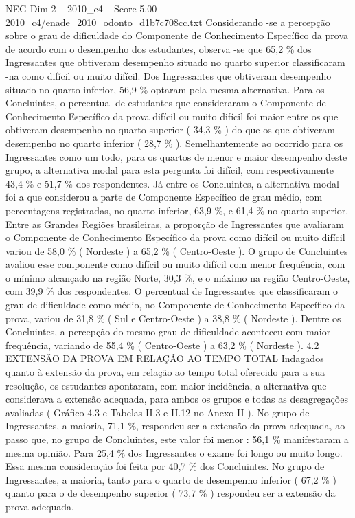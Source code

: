 \begin{textsample}{NEG Dim 2 – 2010\_c4 – Score 5.00 – 2010\_c4/enade\_2010\_odonto\_d1b7c708cc.txt}
Considerando -se a percepção sobre o grau de dificuldade do Componente de Conhecimento Específico da prova de acordo com o desempenho dos estudantes, observa -se que 65,2 \% dos Ingressantes que obtiveram desempenho situado no quarto superior classificaram -na como difícil ou muito difícil.
Dos Ingressantes que obtiveram desempenho situado no quarto inferior, 56,9 \% optaram pela mesma alternativa.
Para os Concluintes, o percentual de estudantes que consideraram o Componente de Conhecimento Específico da prova difícil ou muito difícil foi maior entre os que obtiveram desempenho no quarto superior ( 34,3 \% ) do que os que obtiveram desempenho no quarto inferior ( 28,7 \% ).
Semelhantemente ao ocorrido para os Ingressantes como um todo, para os quartos de menor e maior desempenho deste grupo, a alternativa modal para esta pergunta foi difícil, com respectivamente 43,4 \% e 51,7 \% dos respondentes.
Já entre os Concluintes, a alternativa modal foi a que considerou a parte de Componente Específico de grau médio, com percentagens registradas, no quarto inferior, 63,9 \%, e 61,4 \% no quarto superior.
Entre as Grandes Regiões brasileiras, a proporção de Ingressantes que avaliaram o Componente de Conhecimento Específico da prova como difícil ou muito difícil variou de 58,0 \% ( Nordeste ) a 65,2 \% ( Centro-Oeste ).
O grupo de Concluintes avaliou esse componente como difícil ou muito difícil com menor frequência, com o mínimo alcançado na região Norte, 30,3 \%, e o máximo na região Centro-Oeste, com 39,9 \% dos respondentes.
O percentual de Ingressantes que classificaram o grau de dificuldade como médio, no Componente de Conhecimento Específico da prova, variou de 31,8 \% ( Sul e Centro-Oeste ) a 38,8 \% ( Nordeste ).
Dentre os Concluintes, a percepção do mesmo grau de dificuldade aconteceu com maior frequência, variando de 55,4 \% ( Centro-Oeste ) a 63,2 \% ( Nordeste ). 4.2 EXTENSÃO DA PROVA EM RELAÇÃO AO TEMPO TOTAL Indagados quanto à extensão da prova, em relação ao tempo total oferecido para a sua resolução, os estudantes apontaram, com maior incidência, a alternativa que considerava a extensão adequada, para ambos os grupos e todas as desagregações avaliadas ( Gráfico 4.3 e Tabelas II.3 e II.12 no Anexo II ).
No grupo de Ingressantes, a maioria, 71,1 \%, respondeu ser a extensão da prova adequada, ao passo que, no grupo de Concluintes, este valor foi menor : 56,1 \% manifestaram a mesma opinião.
Para 25,4 \% dos Ingressantes o exame foi longo ou muito longo.
Essa mesma consideração foi feita por 40,7 \% dos Concluintes.
No grupo de Ingressantes, a maioria, tanto para o quarto de desempenho inferior ( 67,2 \% ) quanto para o de desempenho superior ( 73,7 \% ) respondeu ser a extensão da prova adequada.

\end{textsample}
